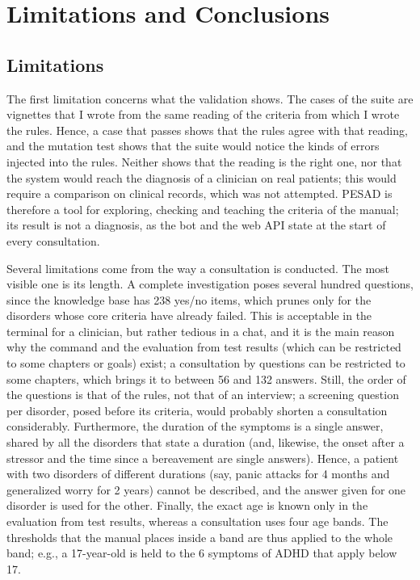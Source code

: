 \chapter{Limitations and Conclusions}
\label{chap:conclusions}

\section{Limitations}
\label{sec:limitations}

The first limitation concerns what the validation shows. The cases of the suite
are vignettes that I wrote from the same reading of the criteria from which I
wrote the rules. Hence, a case that passes shows that the rules agree with that
reading, and the mutation test shows that the suite would notice the kinds of errors injected into
the rules. Neither shows that the reading is the right one, nor that the system
would reach the diagnosis of a clinician on real patients; this would require a
comparison on clinical records, which was not attempted. PESAD is therefore a
tool for exploring, checking and teaching the criteria of the manual; its result is not a diagnosis, as the bot and the web API state at
the start of every consultation.

Several limitations come from the way a consultation is conducted. The most
visible one is its length. A complete investigation poses several hundred
questions, since the knowledge base has 238 yes/no items, which
 prunes only for the disorders whose core criteria have
already failed. This is acceptable in the terminal for a clinician, but rather tedious
in a chat, and it is the main reason why the  command and the
evaluation from test results (which can be restricted to some chapters or goals)
exist; a consultation by questions can be restricted to some chapters, which
brings it to between 56 and 132 answers. Still, the order of the questions is that of the rules, not that of an interview; a
screening question per disorder, posed before its criteria, would probably
shorten a consultation considerably. Furthermore, the duration of the symptoms is a single
answer, shared by all the disorders that state a duration (and, likewise, the
onset after a stressor and the time since a bereavement are single answers).
Hence, a patient with two disorders of different durations (say, panic attacks
for 4 months and generalized worry for 2 years) cannot be described, and the
answer given for one disorder is used for the other. Finally, the exact age is
known only in the evaluation from test results, whereas a consultation uses four
age bands. The thresholds that the manual places inside a band are thus applied
to the whole band; e.g., a 17-year-old is held to the 6 symptoms of ADHD that
apply below 17.

